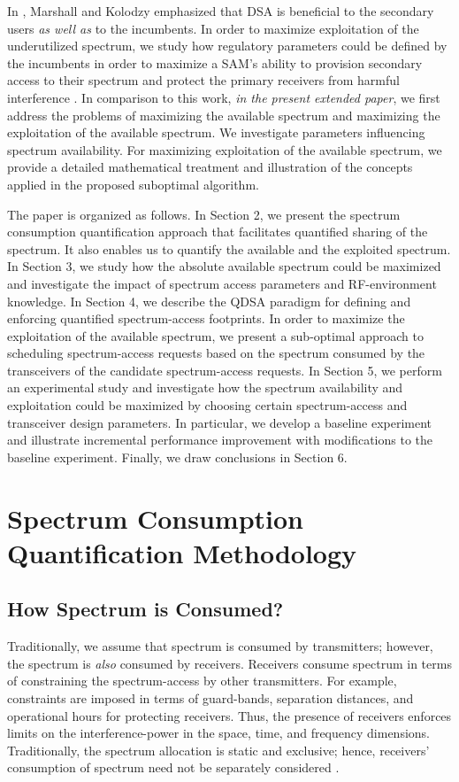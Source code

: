 \documentclass[12pt, draftclsnofoot, onecolumn]{IEEEtran}
\begin{document}
In \cite{pm_wwdsa}, Marshall and Kolodzy emphasized that DSA is beneficial to the secondary users \textit{as well as} to the incumbents. In order to maximize exploitation of the underutilized spectrum, we study how regulatory parameters could be defined by the incumbents in order to maximize a SAM's ability to provision secondary access to their spectrum and protect the primary receivers from harmful interference \cite{oms3_cf1}. In comparison to this work, \textit{in the present extended paper}, we first address the problems of maximizing the available spectrum and maximizing the exploitation of the available spectrum. We investigate parameters influencing spectrum availability. For maximizing exploitation of the available spectrum, we provide a detailed mathematical treatment and illustration of the concepts applied in the proposed suboptimal algorithm.

The paper is organized as follows. In Section 2, we present the spectrum consumption quantification approach that facilitates quantified sharing of the spectrum. It also enables us to quantify the available and the exploited spectrum. In Section 3, we study how the absolute available spectrum could be maximized and investigate the impact of spectrum access parameters and RF-environment knowledge. In Section 4, we describe the QDSA paradigm for defining and enforcing quantified spectrum-access footprints. In order to maximize the exploitation of the available spectrum, we present a sub-optimal approach to scheduling spectrum-access requests based on the spectrum consumed by the transceivers of the candidate spectrum-access requests. In Section 5, we perform an experimental study and investigate how the spectrum availability and exploitation could be maximized by choosing certain spectrum-access and transceiver design parameters. In particular, we develop a baseline experiment and illustrate incremental performance improvement with modifications to the baseline experiment. Finally, we draw conclusions in Section 6.


\section{Spectrum Consumption Quantification Methodology}

\subsection{How Spectrum is Consumed?}
Traditionally, we assume that spectrum is consumed by transmitters; however, the spectrum is \textit{also} consumed by receivers. Receivers consume spectrum in terms of constraining the spectrum-access by other transmitters. For example, constraints are imposed in terms of guard-bands, separation distances, and operational hours for protecting receivers. Thus, the presence of receivers enforces limits on the interference-power in the space, time, and frequency dimensions. Traditionally, the spectrum allocation is static and exclusive; hence, receivers' consumption of spectrum need not be separately considered \cite{itu}.
\end{document}

